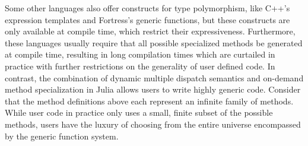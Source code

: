 Some other languages also offer constructs for type polymorphism, like C++'s
expression templates and Fortress's generic functions, but these constructs are
only available at compile time, which restrict their expressiveness.
Furthermore, these languages usually require that all possible specialized
methods be generated at compile time, resulting in long compilation times which
are curtailed in practice with further restrictions on the generality of user
defined code. In contrast, the combination of dynamic multiple dispatch
semantics and on-demand method specialization in Julia allows users to write
highly generic code. Consider that the method definitions above each represent
an infinite family of methods. While user code in practice only uses a small,
finite subset of the possible methods, users have the luxury of choosing from
the entire universe encompassed by the generic function system.

